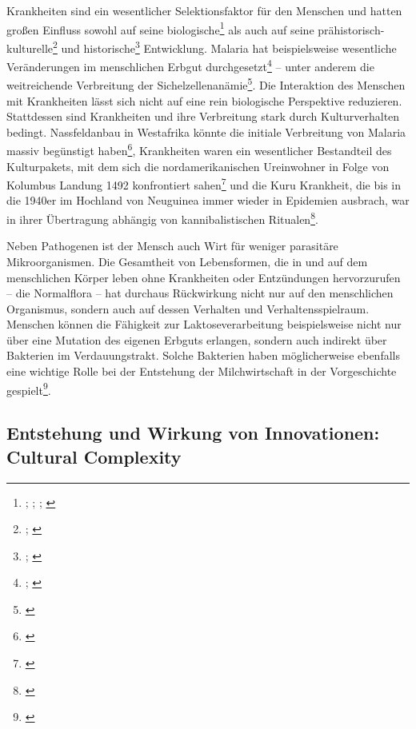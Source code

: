 \documentclass[openany,twoside,twocolumn]{book}
\let\rmarkdownfootnote\footnote%
\def\footnote{\protect\rmarkdownfootnote}
\begin{document}
Krankheiten sind ein wesentlicher Selektionsfaktor für den Menschen und hatten großen Einfluss sowohl auf seine biologische\footnote{\textcite{bustamante_natural_2005}; \textcite{enard_viruses_2016}; \textcite{mead_balancing_2003}; \textcite{sabeti_genome-wide_2007}} als auch auf seine prähistorisch-kulturelle\footnote{\textcite{martin_health_2002}; \textcite{oxenham_skeletal_2005}} und historische\footnote{\textcite{alfani_plague_2013}; \textcite{murray_estimation_2006}} Entwicklung. Malaria hat beispielsweise wesentliche Veränderungen im menschlichen Erbgut durchgesetzt\footnote{\textcite{kwiatkowski_how_2005}; \textcite{tishkoff_haplotype_2001}} -- unter anderem die weitreichende Verbreitung der Sichelzellenanämie\footnote{\textcite{allison_protection_1954}}. Die Interaktion des Menschen mit Krankheiten lässt sich nicht auf eine rein biologische Perspektive reduzieren. Stattdessen sind Krankheiten und ihre Verbreitung stark durch Kulturverhalten bedingt. Nassfeldanbau in Westafrika könnte die initiale Verbreitung von Malaria massiv begünstigt haben\footnote{\textcite{durham_coevolution_1991-1}}, Krankheiten waren ein wesentlicher Bestandteil des Kulturpakets, mit dem sich die nordamerikanischen Ureinwohner in Folge von Kolumbus Landung 1492 konfrontiert sahen\footnote{\textcite{nunn_columbian_2010}} und die Kuru Krankheit, die bis in die 1940er im Hochland von Neuguinea immer wieder in Epidemien ausbrach, war in ihrer Übertragung abhängig von kannibalistischen Ritualen\footnote{\textcite{lindenbaum_kuru_2015}}.

Neben Pathogenen ist der Mensch auch Wirt für weniger parasitäre Mikroorganismen. Die Gesamtheit von Lebensformen, die in und auf dem menschlichen Körper leben ohne Krankheiten oder Entzündungen hervorzurufen -- die Normalflora -- hat durchaus Rückwirkung nicht nur auf den menschlichen Organismus, sondern auch auf dessen Verhalten und Verhaltensspielraum. Menschen können die Fähigkeit zur Laktoseverarbeitung beispielsweise nicht nur über eine Mutation des eigenen Erbguts erlangen, sondern auch indirekt über Bakterien im Verdauungstrakt. Solche Bakterien haben möglicherweise ebenfalls eine wichtige Rolle bei der Entstehung der Milchwirtschaft in der Vorgeschichte gespielt\footnote{\textcite{walter_human_2011}}.

\hypertarget{cultural-complexity}{%
\subsection{Entstehung und Wirkung von Innovationen: Cultural Complexity}\label{cultural-complexity}}
\end{document}
